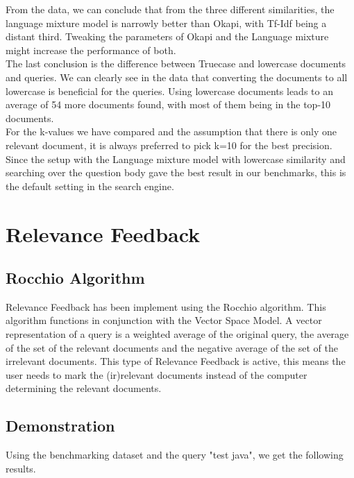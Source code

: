 \documentclass{article}
\begin{document}
From the data, we can conclude that from the three different similarities, the language mixture model is narrowly better than Okapi, with Tf-Idf being a distant third. Tweaking the parameters of Okapi and the Language mixture might increase the performance of both.\\

The last conclusion is the difference between Truecase and lowercase documents and queries. We can clearly see in the data that converting the documents to all lowercase is beneficial for the queries. Using lowercase documents leads to an average of 54 more documents found, with most of them being in the top-10 documents.\\

For the k-values we have compared and the assumption that there is only one relevant document, it is always preferred to pick k=10 for the best precision.\\

Since the setup with the Language mixture model with lowercase similarity and searching over the question body gave the best result in our benchmarks, this is the default setting in the search engine.

\newpage

\section{Relevance Feedback}
\subsection{Rocchio Algorithm}
Relevance Feedback has been implement using the Rocchio algorithm. This algorithm functions in conjunction with the Vector Space Model. A vector representation of a query is a weighted average of the original query, the average of the set of the relevant documents and the negative average of the set of the irrelevant documents. This type of Relevance Feedback is active, this means the user needs to mark the (ir)relevant documents instead of the computer determining the relevant documents.

\subsection{Demonstration}
Using the benchmarking dataset and the query "test java", we get the following results.
\end{document}
